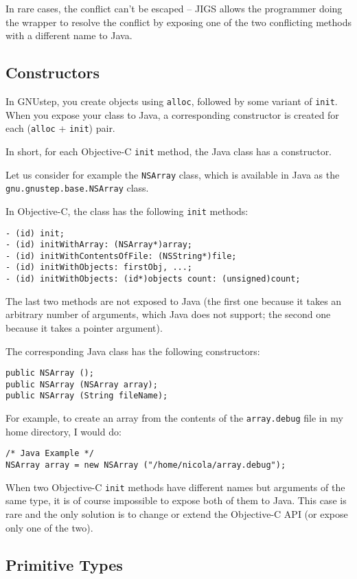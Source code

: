 In rare cases, the conflict can't be escaped -- JIGS allows the
programmer doing the wrapper to resolve the conflict by exposing one
of the two conflicting methods with a different name to Java.

\subsection{Constructors}
In GNUstep, you create objects using \texttt{alloc}, followed by some
variant of \texttt{init}.  When you expose your class to Java, a
corresponding constructor is created for each
(\texttt{alloc} + \texttt{init}) pair.  

In short, for each Objective-C \texttt{init} method, the Java class
has a constructor.

Let us consider for example the \texttt{NSArray} class, which is
available in Java as the \texttt{gnu.gnustep.base.NSArray} class.

In Objective-C, the class has the following \texttt{init} methods:
\begin{verbatim}
- (id) init;
- (id) initWithArray: (NSArray*)array;
- (id) initWithContentsOfFile: (NSString*)file;
- (id) initWithObjects: firstObj, ...;
- (id) initWithObjects: (id*)objects count: (unsigned)count;
\end{verbatim}
The last two methods are not exposed to Java (the first one because it
takes an arbitrary number of arguments, which Java does not support;
the second one because it takes a pointer argument).

The corresponding Java class has the following constructors:
\begin{verbatim}
public NSArray ();
public NSArray (NSArray array);
public NSArray (String fileName);
\end{verbatim}

For example, to create an array from the contents of the
\texttt{array.debug} file in my home directory, I would do:
\begin{verbatim}
/* Java Example */
NSArray array = new NSArray ("/home/nicola/array.debug");
\end{verbatim}

When two Objective-C \texttt{init} methods have different names but
arguments of the same type, it is of course impossible to expose both
of them to Java.  This case is rare and the only solution is to change
or extend the Objective-C API (or expose only one of the two).

\subsection{Primitive Types}

